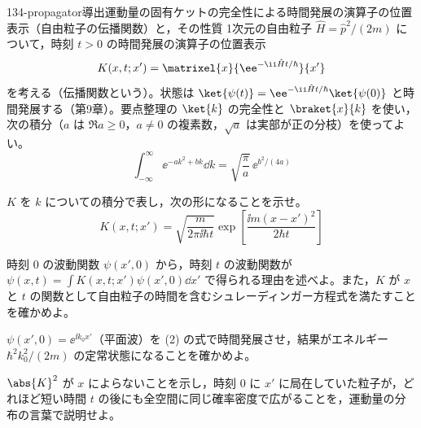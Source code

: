 \documentclass[uplatex,dvipdfmx,a4paper,11pt]{jsarticle}
\begin{document}
\begin{mondai}{134-propagator}{導出}{運動量の固有ケットの完全性による時間発展の演算子の位置表示（自由粒子の伝播関数）と，その性質}
1次元の自由粒子 $\hat{H}=\hat{p}^{2}/(2m)$ について，時刻 $t>0$ の時間発展の演算子の位置表示
  \[ K(x,t;x')=\matrixel{x}{\ee^{-\ii\hat{H}t/\hbar}}{x'} \]
  を考える（伝播関数という）。状態は $\ket{\psi(t)}=\ee^{-\ii\hat{H}t/\hbar}\ket{\psi(0)}$ と時間発展する（第9章）。要点整理の $\ket{k}$ の完全性と $\braket{x}{k}$ を使い，次の積分（$a$ は $\Re a\ge0$，$a\neq0$ の複素数，$\sqrt{a}$ は実部が正の分枝）を使ってよい。
  \[ \int_{-\infty}^{\infty}\ee^{-ak^{2}+bk}\dd k=\sqrt{\frac{\pi}{a}}\,\ee^{b^{2}/(4a)} \]
  \begin{shoumon}
    \item $K$ を $k$ についての積分で表し，次の形になることを示せ。
    \[ K(x,t;x')=\sqrt{\frac{m}{2\pi\ii\hbar t}}\exp\left[\frac{\ii m(x-x')^{2}}{2\hbar t}\right] \]
    \item 時刻 $0$ の波動関数 $\psi(x',0)$ から，時刻 $t$ の波動関数が $\psi(x,t)=\int K(x,t;x')\psi(x',0)\dd x'$ で得られる理由を述べよ。また，$K$ が $x$ と $t$ の関数として自由粒子の時間を含むシュレーディンガー方程式を満たすことを確かめよ。
    \item $\psi(x',0)=\ee^{\ii k_{0}x'}$（平面波）を (2) の式で時間発展させ，結果がエネルギー $\hbar^{2}k_{0}^{2}/(2m)$ の定常状態になることを確かめよ。
    \item $\abs{K}^{2}$ が $x$ によらないことを示し，時刻 $0$ に $x'$ に局在していた粒子が，どれほど短い時間 $t$ の後にも全空間に同じ確率密度で広がることを，運動量の分布の言葉で説明せよ。
  \end{shoumon}


\end{mondai}
\end{document}
